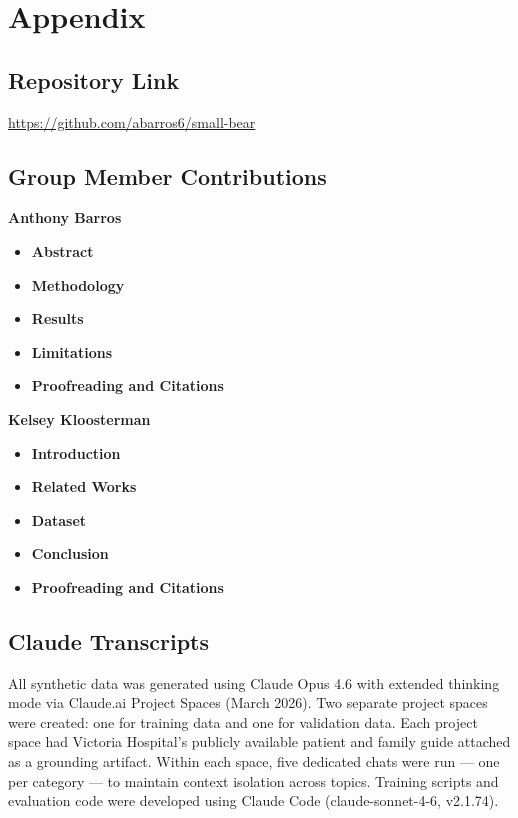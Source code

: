 \documentclass[journal]{IEEEtai}
\begin{document}
\clearpage
\section*{Appendix}

\subsection{Repository Link}
\noindent \url{https://github.com/abarros6/small-bear}

\subsection{Group Member Contributions}
\textbf{Anthony Barros}
\begin{itemize}
    \item \textbf{Abstract}
    \item \textbf{Methodology} 
    \item \textbf{Results}
    \item \textbf{Limitations}
    \item \textbf{Proofreading and Citations}
\end{itemize}

\textbf{Kelsey Kloosterman}
\begin{itemize}
    \item \textbf{Introduction}
    \item \textbf{Related Works} 
    \item \textbf{Dataset} 
    \item \textbf{Conclusion}
    \item \textbf{Proofreading and Citations}
\end{itemize}


\subsection{Claude Transcripts}

All synthetic data was generated using Claude Opus 4.6 with extended thinking mode via Claude.ai Project Spaces (March 2026). Two separate project spaces were created: one for training data and one for validation data. Each project space had Victoria Hospital's publicly available patient and family guide attached as a grounding artifact. Within each space, five dedicated chats were run --- one per category --- to maintain context isolation across topics. Training scripts and evaluation code were developed using Claude Code (claude-sonnet-4-6, v2.1.74).
\end{document}
